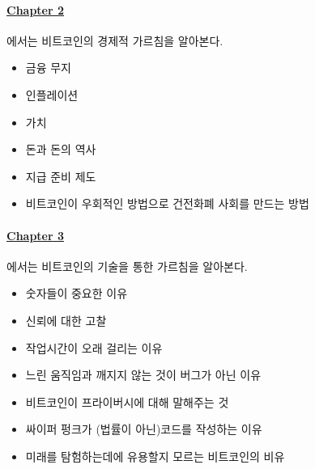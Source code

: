 \paragraph{\hyperref[ch:economics]{Chapter 2}}{에서는 비트코인의 경제적 가르침을 알아본다.
\begin{itemize}
	\item 금융 무지
	\item 인플레이션
	\item 가치
	\item 돈과 돈의 역사
	\item 지급 준비 제도
	\item 비트코인이 우회적인 방법으로 건전화폐 사회를 만드는 방법
	\end{itemize}}
	
\paragraph{\hyperref[ch:technology]{Chapter 3}}{에서는 비트코인의 기술을 통한 가르침을 알아본다.
\begin{itemize}
	\item 숫자들이 중요한 이유
	\item 신뢰에 대한 고찰
	\item 작업시간이 오래 걸리는 이유
	\item 느린 움직임과 깨지지 않는 것이 버그가 아닌 이유
	\item 비트코인이 프라이버시에 대해 말해주는 것
	\item 싸이퍼 펑크가 (법률이 아닌)코드를 작성하는 이유
	\item 미래를 탐험하는데에 유용할지 모르는 비트코인의 비유
	\end{itemize}}
	

